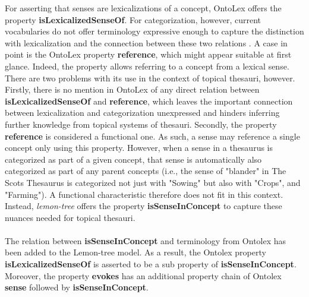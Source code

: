 For asserting that senses are lexicalizations of a concept, OntoLex offers the property \textbf{isLexicalizedSenseOf}.
For categorization, however, current vocabularies do not offer terminology expressive enough to capture the distinction with lexicalization and the connection between these two relations \cite{stolk-2017}. 
A case in point is the OntoLex property \textbf{reference}, which might appear suitable at first glance. Indeed, the property allows referring to a concept from a lexical sense. There are two problems with its use in the context of topical thesauri, however. 
Firstly, there is no mention in OntoLex of any direct relation between \textbf{isLexicalizedSenseOf} and \textbf{reference}, which leaves the important connection between lexicalization and categorization unexpressed and hinders inferring further knowledge from topical systems of thesauri. 
Secondly, the property \textbf{reference} is considered a functional one. As such, a sense may reference a single concept only using this property. However, when a sense in a thesaurus is categorized as part of a given concept, that sense is automatically also categorized as part of any parent concepts (i.e., the sense of "blander" in The Scots Thesaurus is categorized not just with "Sowing" but also with "Crops", and "Farming"). A functional characteristic therefore does not fit in this context. 
Instead, \emph{lemon-tree} offers the property \textbf{isSenseInConcept} to capture these nuances needed for topical thesauri.
\\

\\

The relation between \textbf{isSenseInConcept} and terminology from Ontolex has been added to the Lemon-tree model. As a result, the Ontolex property \textbf{isLexicalizedSenseOf} is asserted to be a sub property of \textbf{isSenseInConcept}. Moreover, the property \textbf{evokes} has an additional property chain of Ontolex \textbf{sense} followed by \textbf{isSenseInConcept}.
\\

